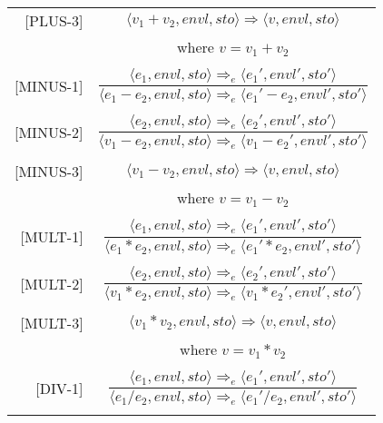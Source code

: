 \begin{longtable}[c] { r c }
  [PLUS-3] & 
    \( \langle v_1 + v_2, envl, sto \rangle \Rightarrow \langle v, envl, sto \rangle \) \\
  & where \( v = v_1 + v_2\) \\
  & \\

  [MINUS-1] & 
    \( \dfrac { \langle e_1, envl, sto \rangle \Rightarrow_e \langle e_1', envl', sto' \rangle }
      {\langle e_1 - e_2, envl, sto \rangle \Rightarrow_e \langle e_1' - e_2, envl', sto' \rangle } \) \\
  & \\

  [MINUS-2] & 
    \( \dfrac { \langle e_2, envl, sto \rangle \Rightarrow_e \langle e_2', envl', sto' \rangle }
      {\langle v_1 - e_2, envl, sto \rangle \Rightarrow_e \langle v_1 - e_2', envl', sto' \rangle } \) \\
  & \\

  [MINUS-3] & 
    \( \langle v_1 - v_2, envl, sto \rangle \Rightarrow \langle v, envl, sto \rangle \) \\
  & where \( v = v_1 - v_2\) \\
  & \\

  [MULT-1] & 
    \( \dfrac { \langle e_1, envl, sto \rangle \Rightarrow_e \langle e_1', envl', sto' \rangle }
      {\langle e_1 * e_2, envl, sto \rangle \Rightarrow_e \langle e_1' * e_2, envl', sto' \rangle } \) \\
  & \\

  [MULT-2] & 
    \( \dfrac { \langle e_2, envl, sto \rangle \Rightarrow_e \langle e_2', envl', sto' \rangle }
      {\langle v_1 * e_2, envl, sto \rangle \Rightarrow_e \langle v_1 * e_2', envl', sto' \rangle } \) \\
  & \\

  [MULT-3] & 
    \( \langle v_1 * v_2, envl, sto \rangle \Rightarrow \langle v, envl, sto \rangle \) \\
  & where \( v = v_1 * v_2\) \\
  & \\

  [DIV-1] & 
    \( \dfrac { \langle e_1, envl, sto \rangle \Rightarrow_e \langle e_1', envl', sto' \rangle }
      {\langle e_1 / e_2, envl, sto \rangle \Rightarrow_e \langle e_1' / e_2, envl', sto' \rangle } \) \\
  & \\


\end{longtable}
